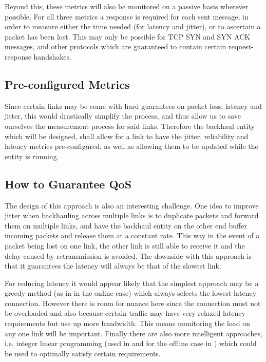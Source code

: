 Beyond this, these metrics will also be monitored on a passive basis wherever possible. For all three metrics a response is required for each sent message, in order to measure either the time needed (for latency and jitter), or to ascertain a packet has been lost. This may only be possible for TCP SYN and SYN ACK messages, and other protocols which are guaranteed to contain certain request-response handshakes.

\subsection{Pre-configured Metrics}

Since certain links may be come with hard guarantees on packet loss, latency and jitter, this would drastically simplify the process, and thus allow us to save ourselves the measurement process for said links. Therefore the backhaul entity which will be designed, shall allow for a link to have the jitter, reliability and latency metrics pre-configured, as well as allowing them to be updated while the entity is running.

\subsection{How to Guarantee QoS}

The design of this approach is also an interesting challenge. One idea to improve jitter when backhauling across multiple links is to duplicate packets and forward them on multiple links, and have the backhaul entity on the other end buffer incoming packets and release them at a constant rate. This way in the event of a packet being lost on one link, the other link is still able to receive it and the delay caused by retransmission is avoided. The downside with this approach is that it guarantees the latency will always be that of the slowest link.

For reducing latency it would appear likely that the simplest approach may be a greedy method (as in \cite{goldenberg2004optimizing} in the online case) which always selects the lowest latency connection. However there is room for nuance here since the connection must not be overloaded and also because certain traffic may have very relaxed latency requirements but use up more bandwidth. This means monitoring the load on any one link will be important. Finally there are also more intelligent approaches, i.e. integer linear programming (used in \cite{huang2008multiconstrained} and for the offline case in \cite{goldenberg2004optimizing}) which could be used to optimally satisfy certain requirements.

